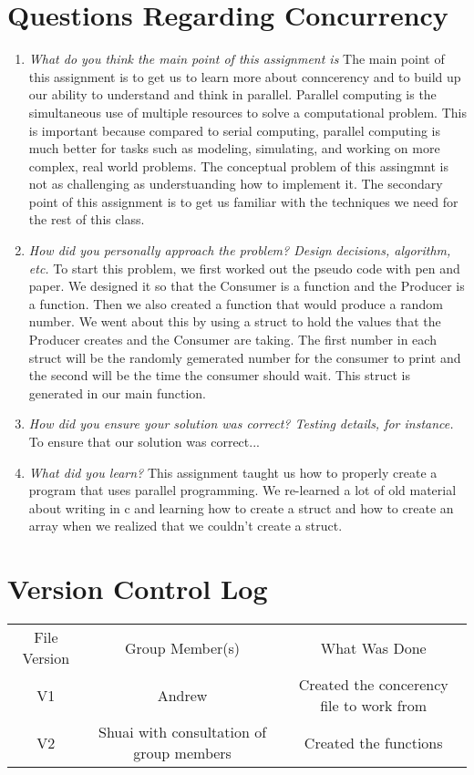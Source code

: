 \section{Questions Regarding Concurrency}
\begin{enumerate}

   \item \textit{What do you think the main point of this assignment is} The main point of this assignment is to get us to learn more about conncerency and to build up our ability to understand and think in parallel. Parallel computing is the simultaneous use of multiple resources to solve a computational problem. This is important because compared to serial computing, parallel computing is much better for tasks such as modeling, simulating, and working on more complex, real world problems. The conceptual problem of this assingmnt is not as challenging as understuanding how to implement it. The secondary point of this assignment is to get us familiar with the techniques we need for the rest of this class. 

   \item \textit{How did you personally approach the problem? Design decisions, algorithm, etc.} To start this problem, we first worked out the pseudo code with pen and paper.  We designed it so that the Consumer is a function and the Producer is a function. Then we also created a function that would produce a random number. We went about this by using a struct to hold the values that the Producer creates and the Consumer are taking. The first number in each struct will be the randomly gemerated number for the consumer to print and the second will be the time the consumer should wait. This struct is generated in our main function.  

   \item \textit{How did you ensure your solution was correct? Testing details, for instance.} To ensure that our solution was correct...

   \item \textit{What did you learn?} This assignment taught us how to properly create a program that uses parallel programming. We re-learned a lot of old material about writing in c and learning how to create a struct and how to create an array when we realized that we couldn't create a struct.  

\end{enumerate}

\section{Version Control Log}
\begin{center}
\begin{tabular}{ |c|c|c| }
   File Version & Group Member(s) & What Was Done \\
   V1 & Andrew & Created the concerency file to work from \\
   V2 & Shuai with consultation of group members & Created the functions
\end{tabular}
\end{center}

